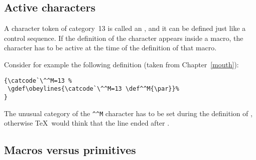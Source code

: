 \documentclass[letterpaper]{book}
\begin{document}
\subsection{Active characters}

A character token of category~13 is called an
, and it
can be defined just like a control sequence.
If the definition of the character appears inside a macro,
the character has to be active at the time of the definition
of that macro.

Consider for example the following definition
(taken from Chapter~\ref{mouth}):
\begin{verbatim}
{\catcode`\^^M=13 %
 \gdef\obeylines{\catcode`\^^M=13 \def^^M{\par}}%
}
\end{verbatim}
The unusual category of the \verb>^^M> character
has to be set during the definition of ,
otherwise \TeX\ would think that the line ended
after .

\subsection{Macros versus primitives}
\end{document}

